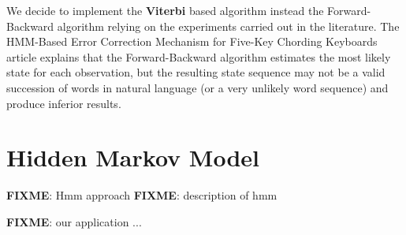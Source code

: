 We decide to implement the \textbf{Viterbi} based algorithm instead the Forward-Backward algorithm relying on the 
experiments carried out in the literature.
The HMM-Based Error Correction Mechanism for Five-Key Chording Keyboards article \cite{tarniceriu2015hmm} explains 
that the Forward-Backward algorithm estimates the most likely state for each observation, but the resulting state 
sequence may not be a valid succession of words in natural language (or a very unlikely word sequence) and produce 
inferior results.


\section{Hidden Markov Model}


\textbf{FIXME}: Hmm approach
\textbf{FIXME}: description of hmm

\textbf{FIXME}: our application ...